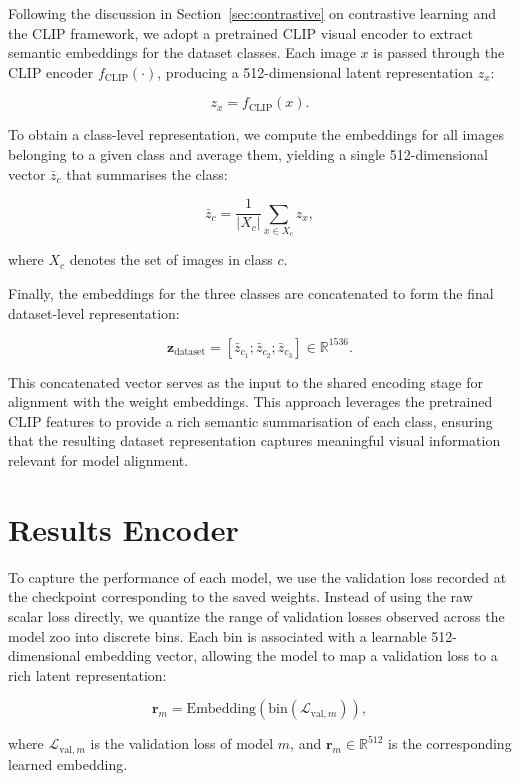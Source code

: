Following the discussion in Section~\ref{sec:contrastive} on contrastive learning and the CLIP framework, we adopt a pretrained CLIP visual encoder to extract semantic embeddings for the dataset classes. Each image $x$ is passed through the CLIP encoder $f_{\text{CLIP}}(\cdot)$, producing a 512-dimensional latent representation $z_x$:

\[
z_x = f_{\text{CLIP}}(x).
\]

To obtain a class-level representation, we compute the embeddings for all images belonging to a given class and average them, yielding a single 512-dimensional vector $\bar{z}_c$ that summarises the class:

\[
\bar{z}_c = \frac{1}{|X_c|} \sum_{x \in X_c} z_x,
\]

where $X_c$ denotes the set of images in class $c$. 

Finally, the embeddings for the three classes are concatenated to form the final dataset-level representation:

\[
\mathbf{z}_{\text{dataset}} = [\bar{z}_{c_1}; \bar{z}_{c_2}; \bar{z}_{c_3}] \in \mathbb{R}^{1536}.
\]

This concatenated vector serves as the input to the shared encoding stage for alignment with the weight embeddings. This approach leverages the pretrained CLIP features to provide a rich semantic summarisation of each class, ensuring that the resulting dataset representation captures meaningful visual information relevant for model alignment.

\section{Results Encoder}
\label{sec:results_enc}

To capture the performance of each model, we use the validation loss recorded at the checkpoint corresponding to the saved weights. Instead of using the raw scalar loss directly, we quantize the range of validation losses observed across the model zoo into discrete bins. Each bin is associated with a learnable 512-dimensional embedding vector, allowing the model to map a validation loss to a rich latent representation:

\[
\mathbf{r}_m = \text{Embedding}(\text{bin}(\mathcal{L}_{\text{val}, m})),
\]

where $\mathcal{L}_{\text{val}, m}$ is the validation loss of model $m$, and $\mathbf{r}_m \in \mathbb{R}^{512}$ is the corresponding learned embedding.  

